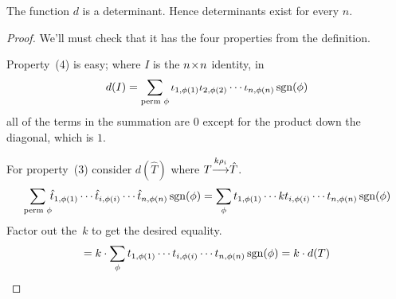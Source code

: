 \begin{lemma}
The function \( d \) is a determinant.
Hence determinants exist for every $n$.
\end{lemma}

\begin{proof}
We'll must check that it has the four properties
from the definition.

Property~(4) is easy; where $I$ is the $n \! \times \! n$ identity, in
\begin{equation*}
  d(I)=
  \sum_{\text{perm\ }\phi}
    \iota_{1,\phi(1)}\iota_{2,\phi(2)}\cdots \iota_{n,\phi(n)}
                                 \operatorname{sgn}(\phi)
\end{equation*}
all of the terms in the summation are $0$ 
except for the product down the diagonal,
which is $1$.

For property~(3) consider $d(\hat{T})$ where 
\( T\smash[b]{\mathrel{ \mathop{\longrightarrow}\limits^{k\rho_i\mathstrut}_{ \begin{subarray}{l} \relax \end{subarray}}}}\hat{T} \).
\begin{equation*}
  \sum_{\text{perm\ }\phi}\!\!
    \hat{t}_{1,\phi(1)}
     \cdots\hat{t}_{i,\phi(i)}\cdots\hat{t}_{n,\phi(n)}
                                 \operatorname{sgn}(\phi)                      
  =\sum_{\phi}
     t_{1,\phi(1)}\cdots kt_{i,\phi(i)}\cdots t_{n,\phi(n)}
                                 \operatorname{sgn}(\phi)
\end{equation*}
Factor out the~\( k \) to get the desired equality.
\begin{equation*}
  =k\cdot\sum_{\phi}
     t_{1,\phi(1)}\cdots t_{i,\phi(i)}\cdots t_{n,\phi(n)}
                                 \operatorname{sgn}(\phi)                 
  =k\cdot d(T)
\end{equation*}


\end{proof}
